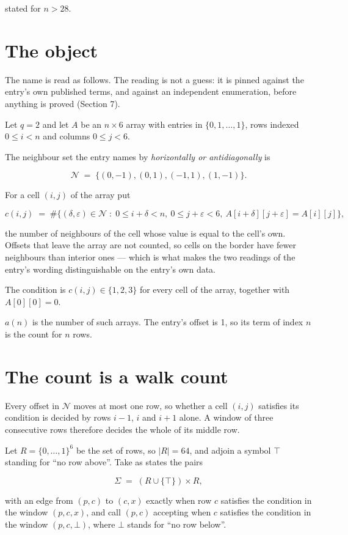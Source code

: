 \documentclass[11pt]{article}
\theoremstyle{definition}
\begin{document}
stated for $n > 28$.

\section{The object}

The name is read as follows. The reading is not a guess: it is pinned against the entry's own published terms, and against an independent enumeration, before anything is proved (Section 7).

Let $q = 2$ and let $A$ be an $n \times 6$ array with entries in $\{0,1,\dots,1\}$, rows indexed $0 \le i < n$ and columns $0 \le j < 6$.

The neighbour set the entry names by {\itshape horizontally or antidiagonally} is

\[\mathcal{N} \;=\; \{(0,-1), (0,1), (-1,1), (1,-1)\}.\]

For a cell $(i,j)$ of the array put

\[c(i,j) \;=\; \#\bigl\{(\delta,\varepsilon)\in\mathcal{N} \;:\; 0\le i+\delta<n,\ 0\le j+\varepsilon<6,\ A[i+\delta][j+\varepsilon] = A[i][j]\bigr\},\]

the number of neighbours of the cell whose value is equal to the cell's own. Offsets that leave the array are not counted, so cells on the border have fewer neighbours than interior ones --- which is what makes the two readings of the entry's wording distinguishable on the entry's own data.

The condition is $c(i,j) \in \{1, 2, 3\}$ for every cell of the array, together with $A[0][0]=0$.

$a(n)$ is the number of such arrays. The entry's offset is 1, so its term of index $n$ is the count for $n$ rows.

\section{The count is a walk count}

Every offset in $\mathcal{N}$ moves at most one row, so whether a cell $(i,j)$ satisfies its condition is decided by rows $i-1$, $i$ and $i+1$ alone. A window of three consecutive rows therefore decides the whole of its middle row.

Let $R = \{0,\dots,1\}^{6}$ be the set of rows, so $|R| = 64$, and adjoin a symbol $\top$ standing for ``no row above''. Take as states the pairs

\[\Sigma \;=\; (R \cup \{\top\}) \times R,\]

with an edge from $(p,c)$ to $(c,x)$ exactly when row $c$ satisfies the condition in the window $(p,c,x)$, and call $(p,c)$ accepting when $c$ satisfies the condition in the window $(p,c,\bot)$, where $\bot$ stands for ``no row below''.
\end{document}
